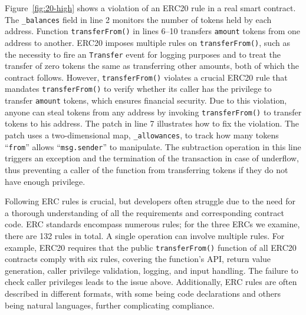 Figure~\ref{fig:20-high} shows a violation of an ERC20 rule in a real smart contract. 
The \texttt{\_balances} field in line 2 monitors the number of tokens held by each 
address. Function \texttt{transferFrom()} in lines 6--10 transfers
\texttt{amount} tokens from one address to another. 
ERC20 imposes multiple rules on \texttt{transferFrom()}, such as the necessity to fire an \texttt{Transfer} event for logging purposes and to
treat the transfer of zero tokens the same as transferring other amounts, both of which the contract follows. %
However, \texttt{transferFrom()} violates a crucial ERC20 rule that mandates \texttt{transferFrom()} to verify whether its caller has the privilege to transfer \texttt{amount} tokens, which ensures financial security. 
Due to this violation, anyone can steal tokens from any address by invoking \texttt{transferFrom()} to transfer tokens to his address. 
The patch in line 7 illustrates how to fix the violation. 
The patch uses a two-dimensional map, \texttt{\_allowances}, to track
how many tokens ``\texttt{from}'' allows ``\texttt{msg.sender}'' to manipulate. 
The subtraction operation in this line triggers an exception 
and the termination of the transaction in case of underflow, thus preventing a caller 
of the function from transferring tokens if they do not have enough privilege.





Following ERC rules is crucial, but developers often struggle due to the need for a thorough understanding of all the requirements and corresponding contract code. 
ERC standards encompass numerous rules; for the three ERCs we examine,
there are 132 rules in total. 
A single operation can involve multiple rules. 
For example, ERC20 requires that 
the public \texttt{transferFrom()} function of all ERC20 contracts 
comply with six rules, covering the function’s API, 
return value generation, caller privilege validation, 
logging, and input handling. The failure to check caller privileges 
leads to the issue above. 
Additionally, ERC rules are often described in different formats, 
with some being code declarations and others being natural languages, 
further complicating compliance.



